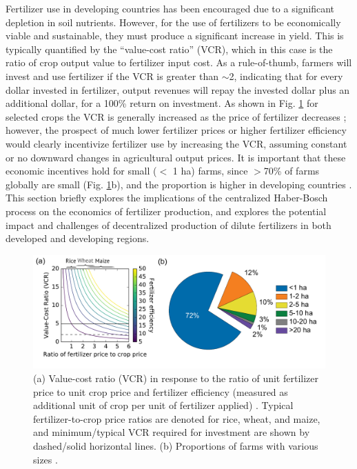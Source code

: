 Fertilizer use in developing countries has been encouraged due to a significant depletion in soil nutrients. However, for the use of fertilizers to be economically viable and sustainable, they must produce a significant increase in yield. This is typically quantified by the ``value-cost ratio'' (VCR), which in this case is the ratio of crop output value to fertilizer input cost. As a rule-of-thumb, farmers will invest and use fertilizer if the VCR is greater than $\sim$2, indicating that for every dollar invested in fertilizer, output revenues will repay the invested dollar plus an additional dollar, for a 100\% return on investment. As shown in Fig. \ref{fig:vcr} for selected crops the VCR is generally increased as the price of fertilizer decreases \cite{sommer_2013}; however, the prospect of much lower fertilizer prices or higher fertilizer efficiency would clearly incentivize fertilizer use by increasing the VCR, assuming constant or no downward changes in agricultural output prices. It is important that these economic incentives hold for small ($<$ 1 ha) farms, since $>$70\% of farms globally are small (Fig. \ref{fig:vcr}b), and the proportion is higher in developing countries \cite{Lowder_2016}. This section briefly explores the implications of the centralized Haber-Bosch process on the economics of fertilizer production, and explores the potential impact and challenges of decentralized production of dilute fertilizers in both developed and developing regions.
\begin{figure}
    \centering
    \includegraphics[width=.9\textwidth]{Figures/VCR_farmsize.pdf}
    \caption{(a) Value-cost ratio (VCR) in response to the ratio of unit fertilizer price to unit crop price and fertilizer efficiency (measured as additional unit of crop per unit of fertilizer applied) \cite{sommer_2013}. Typical fertilizer-to-crop price ratios are denoted for rice, wheat, and maize, and minimum/typical VCR required for investment are shown by dashed/solid horizontal lines. (b) Proportions of farms with various sizes \cite{Lowder_2016}.}
    \label{fig:vcr}
\end{figure}

